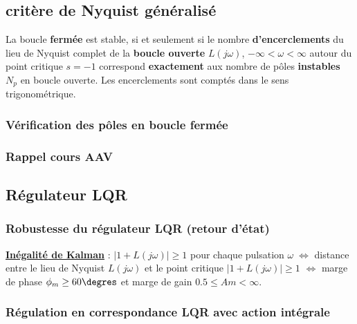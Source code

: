 \documentclass[document.tex]{subfiles}
\begin{document}
\subsection{critère de Nyquist généralisé}

La boucle \textbf{fermée} est stable, si et seulement si le nombre \textbf{d'encerclements} du lieu de Nyquist complet de la \textbf{boucle ouverte} $L(j\omega)$, $-\infty < \omega < \infty $ autour du point critique $s=−1$ correspond \textbf{exactement} aux nombre de pôles \textbf{instables} $N_p$ en boucle ouverte. Les encerclements sont comptés dans le sens trigonométrique.


\subsubsection{Vérification des pôles en boucle fermée}


\subsubsection{Rappel cours AAV}


\subsection{Régulateur LQR}

\subsubsection{Robustesse du régulateur LQR (retour d'état)}

\textbf{\underline{Inégalité de Kalman}} : $\mid 1+L(j \omega) \mid \geq 1$ pour chaque pulsation $\omega \; \Leftrightarrow$ distance entre le lieu de Nyquist $L(j \omega)$ et le point critique $\mid 1+L(j \omega) \mid \geq 1$ $\Leftrightarrow$ marge de phase $\phi_m \geq 60\degres$ et marge de gain $0.5\leq Am < \infty$.\\


\subsubsection{Régulation en correspondance LQR avec action intégrale}

\end{document}
